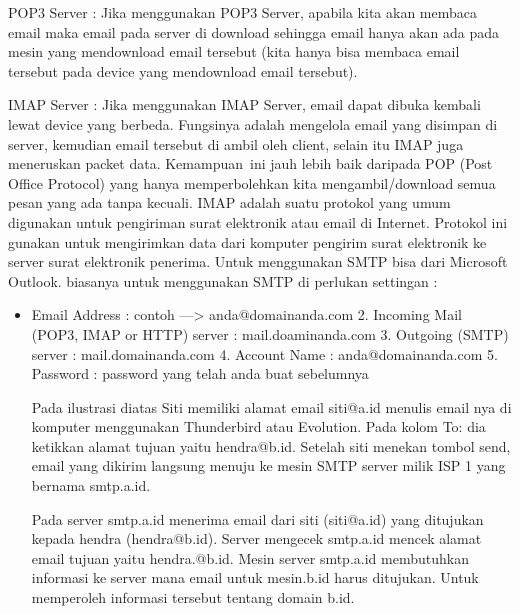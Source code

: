 \documentclass{wileySix}
\begin{document}
\begin{myEnumerate}
\begin{myEnumerate}
		\vspace{12pt}
		\noindent 
		\item POP3 Server : Jika menggunakan POP3 Server, apabila kita akan membaca email maka email pada server di download sehingga email hanya akan ada pada mesin yang mendownload email tersebut (kita hanya bisa membaca email tersebut pada device yang mendownload email tersebut). \par
		\vspace{12pt}
		\noindent 
		\item IMAP Server : Jika menggunakan IMAP Server, email dapat dibuka kembali lewat device yang berbeda. Fungsinya adalah mengelola email yang disimpan di server, kemudian email tersebut di ambil oleh client, selain itu IMAP juga meneruskan packet data. Kemampuan~ini jauh lebih baik daripada POP (Post Office Protocol) yang hanya memperbolehkan kita mengambil/download semua pesan yang ada tanpa kecuali. IMAP adalah suatu  protokol yang umum digunakan untuk pengiriman surat elektronik atau email di Internet. Protokol ini gunakan untuk mengirimkan data dari komputer pengirim surat elektronik ke server surat elektronik penerima. Untuk menggunakan SMTP bisa dari Microsoft Outlook. biasanya untuk menggunakan SMTP di perlukan settingan :\end{myEnumerate}
	\par
	\vspace{12pt}
	\noindent 
	\begin{itemize}
		\item Email Address : contoh —> anda@domainanda.com 2. Incoming Mail (POP3, IMAP or HTTP) server : mail.doaminanda.com 3. Outgoing (SMTP) server : mail.domainanda.com 4. Account Name : anda@domainanda.com 5. Password : password yang telah anda buat sebelumnya \par
		\vspace{12pt}
		Pada ilustrasi diatas Siti memiliki alamat email siti@a.id menulis email nya di komputer menggunakan Thunderbird atau Evolution. Pada kolom To: dia ketikkan alamat tujuan yaitu hendra@b.id. Setelah siti menekan tombol send, email yang dikirim langsung menuju ke mesin SMTP server milik ISP 1 yang bernama smtp.a.id. \par
		\vspace{12pt}
		Pada server smtp.a.id menerima email dari siti (siti@a.id) yang ditujukan kepada hendra (hendra@b.id). Server mengecek smtp.a.id mencek alamat email tujuan yaitu hendra.@b.id. Mesin server smtp.a.id membutuhkan informasi ke server mana email untuk mesin.b.id harus ditujukan. Untuk memperoleh informasi tersebut tentang domain b.id. \par

\end{itemize}
\end{myEnumerate}
\end{document}
